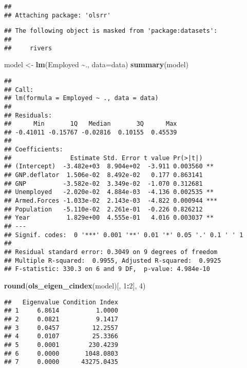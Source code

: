 \documentclass[
]{article}
\newenvironment{Shaded}{\begin{snugshade}}{\end{snugshade}}
\newcommand{\AttributeTok}[1]{\textcolor[rgb]{0.13,0.29,0.53}{#1}}
\newcommand{\DecValTok}[1]{\textcolor[rgb]{0.00,0.00,0.81}{#1}}
\newcommand{\FunctionTok}[1]{\textcolor[rgb]{0.13,0.29,0.53}{\textbf{#1}}}
\newcommand{\NormalTok}[1]{#1}
\newcommand{\OtherTok}[1]{\textcolor[rgb]{0.56,0.35,0.01}{#1}}
\newcommand{\SpecialCharTok}[1]{\textcolor[rgb]{0.81,0.36,0.00}{\textbf{#1}}}
\begin{document}
\begin{enumerate}
\begin{verbatim}
## 
## Attaching package: 'olsrr'
\end{verbatim}

\begin{verbatim}
## The following object is masked from 'package:datasets':
## 
##     rivers
\end{verbatim}

\begin{Shaded}
\begin{Highlighting}[]
\NormalTok{model }\OtherTok{\textless{}{-}} \FunctionTok{lm}\NormalTok{(Employed }\SpecialCharTok{\textasciitilde{}}\NormalTok{., }\AttributeTok{data=}\NormalTok{data)}
\FunctionTok{summary}\NormalTok{(model)}
\end{Highlighting}
\end{Shaded}

\begin{verbatim}
## 
## Call:
## lm(formula = Employed ~ ., data = data)
## 
## Residuals:
##      Min       1Q   Median       3Q      Max 
## -0.41011 -0.15767 -0.02816  0.10155  0.45539 
## 
## Coefficients:
##                Estimate Std. Error t value Pr(>|t|)    
## (Intercept)  -3.482e+03  8.904e+02  -3.911 0.003560 ** 
## GNP.deflator  1.506e-02  8.492e-02   0.177 0.863141    
## GNP          -3.582e-02  3.349e-02  -1.070 0.312681    
## Unemployed   -2.020e-02  4.884e-03  -4.136 0.002535 ** 
## Armed.Forces -1.033e-02  2.143e-03  -4.822 0.000944 ***
## Population   -5.110e-02  2.261e-01  -0.226 0.826212    
## Year          1.829e+00  4.555e-01   4.016 0.003037 ** 
## ---
## Signif. codes:  0 '***' 0.001 '**' 0.01 '*' 0.05 '.' 0.1 ' ' 1
## 
## Residual standard error: 0.3049 on 9 degrees of freedom
## Multiple R-squared:  0.9955, Adjusted R-squared:  0.9925 
## F-statistic: 330.3 on 6 and 9 DF,  p-value: 4.984e-10
\end{verbatim}

\begin{Shaded}
\begin{Highlighting}[]
\FunctionTok{round}\NormalTok{(}\FunctionTok{ols\_eigen\_cindex}\NormalTok{(model)[, }\DecValTok{1}\SpecialCharTok{:}\DecValTok{2}\NormalTok{], }\DecValTok{4}\NormalTok{)}
\end{Highlighting}
\end{Shaded}

\begin{verbatim}
##   Eigenvalue Condition Index
## 1     6.8614          1.0000
## 2     0.0821          9.1417
## 3     0.0457         12.2557
## 4     0.0107         25.3366
## 5     0.0001        230.4239
## 6     0.0000       1048.0803
## 7     0.0000      43275.0435
\end{verbatim}


\end{enumerate}
\end{document}
